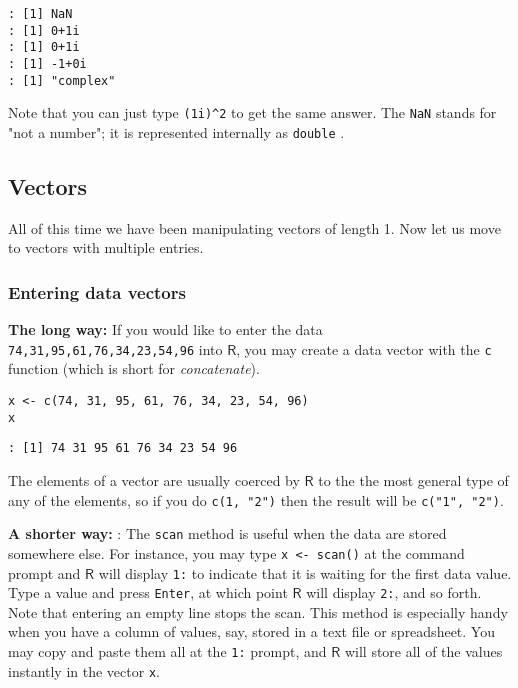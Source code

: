\begin{verbatim}
: [1] NaN
: [1] 0+1i
: [1] 0+1i
: [1] -1+0i
: [1] "complex"
\end{verbatim}

Note that you can just type \texttt{(1i)\textasciicircum{}2} to get the same answer. The
\texttt{NaN}  stands for "not a number"; it is
represented internally as \texttt{double} .

\subsection{Vectors}
\label{sec-2-3-3}

All of this time we have been manipulating vectors of length 1. Now
let us move to vectors with multiple entries.

\subsubsection{Entering data vectors}
\label{sec-2-3-3-1}

\textbf{The long way:}  If you would like to enter the
data \texttt{74,31,95,61,76,34,23,54,96} into \(\mathsf{R}\), you may create
a data vector with the \texttt{c} function (which is short for
\emph{concatenate}).

\begin{verbatim}
x <- c(74, 31, 95, 61, 76, 34, 23, 54, 96)
x
\end{verbatim}

\begin{verbatim}
: [1] 74 31 95 61 76 34 23 54 96
\end{verbatim}

The elements of a vector are usually coerced by \(\mathsf{R}\) to the
the most general type of any of the elements, so if you do \texttt{c(1, "2")}
then the result will be \texttt{c("1", "2")}.

\textbf{A shorter way:} : The \texttt{scan} method is
useful when the data are stored somewhere else. For instance, you may
type \texttt{x <- scan()} at the command prompt and \(\mathsf{R}\) will
display \texttt{1:} to indicate that it is waiting for the first data
value. Type a value and press \texttt{Enter}, at which point \(\mathsf{R}\)
will display \texttt{2:}, and so forth. Note that entering an empty line
stops the scan. This method is especially handy when you have a column
of values, say, stored in a text file or spreadsheet. You may copy and
paste them all at the \texttt{1:} prompt, and \(\mathsf{R}\) will store all
of the values instantly in the vector \texttt{x}.

